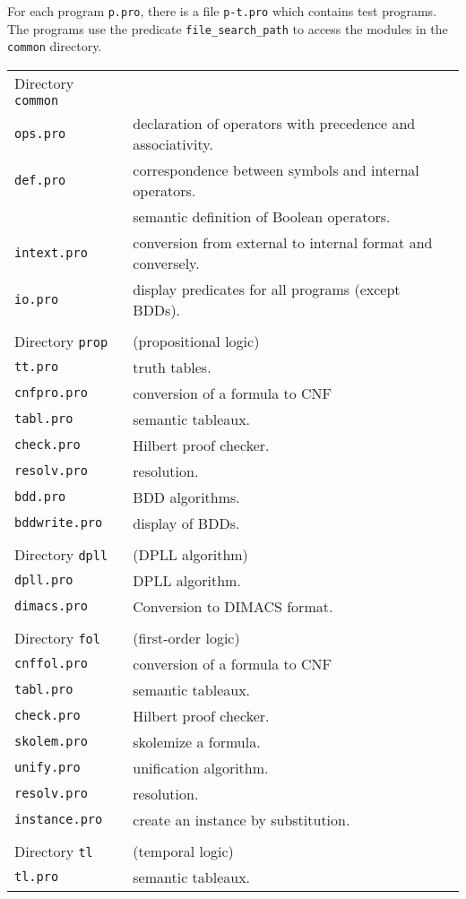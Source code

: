 \documentclass[11pt]{article}
\newcommand*{\p}[1]{\textup{\texttt{#1}}}
\begin{document}
For each program \p{p.pro}, there is a file \p{p-t.pro} which contains
test programs. The programs use the predicate \p{file\_search\_path} to
access the modules in the \p{common} directory.

\smallskip

\begin{tabular}{l@{\hspace{3em}}l}
Directory \p{common}&\\
\p{ops.pro}      & declaration of operators with precedence and
associativity.\\
\p{def.pro}      & correspondence between symbols and internal operators.\\
            & semantic definition of Boolean operators.\\
\p{intext.pro}   & conversion from external to internal format and conversely.\\
\p{io.pro}       & display predicates for all programs (except BDDs).\\
\\
Directory \p{prop} &  (propositional logic)\\
\p{tt.pro}       & truth tables.\\
\p{cnfpro.pro}   & conversion of a formula to CNF\\
\p{tabl.pro}     & semantic tableaux.\\
\p{check.pro}    & Hilbert proof checker.\\
\p{resolv.pro}   & resolution.\\
\p{bdd.pro}      & BDD algorithms.\\
\p{bddwrite.pro} & display of BDDs.\\
\\
Directory \p{dpll} &  (DPLL algorithm)\\
\p{dpll.pro}     & DPLL algorithm.\\
\p{dimacs.pro}   & Conversion to DIMACS format.\\
\\
Directory \p{fol}  & (first-order logic)\\
\p{cnffol.pro}   & conversion of a formula to CNF\\
\p{tabl.pro}     & semantic tableaux.\\
\p{check.pro}    & Hilbert proof checker.\\
\p{skolem.pro}   & skolemize a formula.\\
\p{unify.pro}    & unification algorithm.\\
\p{resolv.pro}   & resolution.\\
\p{instance.pro} & create an instance by substitution.\\
\\
Directory \p{tl}  &   (temporal logic)\\
\p{tl.pro}       & semantic tableaux.\\
\end{tabular}
\end{document}
